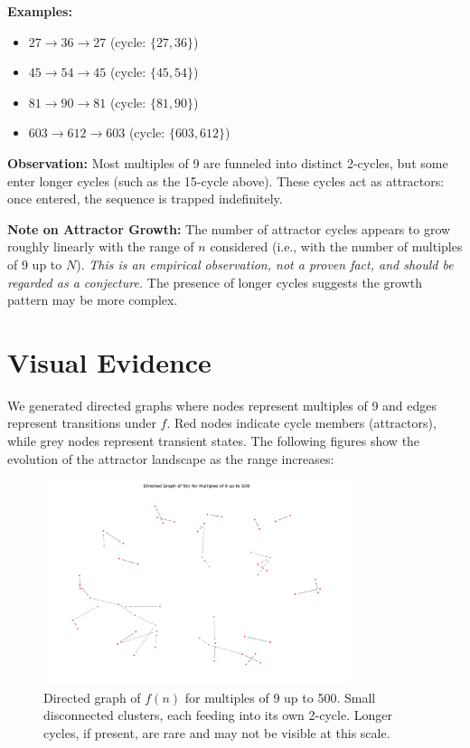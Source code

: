 \documentclass[12pt]{article}
\begin{document}
\textbf{Examples:}
\begin{itemize}
    \item $27 \to 36 \to 27$ (cycle: $\{27, 36\}$)
    \item $45 \to 54 \to 45$ (cycle: $\{45, 54\}$)
    \item $81 \to 90 \to 81$ (cycle: $\{81, 90\}$)
    \item $603 \to 612 \to 603$ (cycle: $\{603, 612\}$)
\end{itemize}

\textbf{Observation:} Most multiples of 9 are funneled into distinct 2-cycles, but some enter longer cycles (such as the 15-cycle above). These cycles act as attractors: once entered, the sequence is trapped indefinitely.

\textbf{Note on Attractor Growth:} The number of attractor cycles appears to grow roughly linearly with the range of $n$ considered (i.e., with the number of multiples of 9 up to $N$). \textit{This is an empirical observation, not a proven fact, and should be regarded as a conjecture.} The presence of longer cycles suggests the growth pattern may be more complex.

\section{Visual Evidence}

We generated directed graphs where nodes represent multiples of 9 and edges represent transitions under $f$. Red nodes indicate cycle members (attractors), while grey nodes represent transient states. The following figures show the evolution of the attractor landscape as the range increases:


\begin{figure}[h!]
    \centering
    \includegraphics[width=0.8\textwidth]{fig_cycles_graph_N500.png}
    \caption{Directed graph of $f(n)$ for multiples of 9 up to 500. Small disconnected clusters, each feeding into its own 2-cycle. Longer cycles, if present, are rare and may not be visible at this scale.}
\end{figure}
\end{document}
